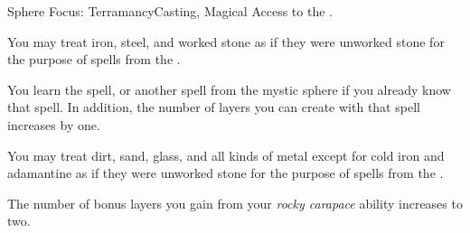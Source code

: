   \begin{magicalfeat}{Sphere Focus: Terramancy}{Casting, Magical}
    \featpre Access to the  .

     You may treat iron, steel, and worked stone as if they were unworked stone for the purpose of spells from the  .

     You learn the  spell, or another spell from the  mystic sphere if you already know that spell.
    In addition, the number of layers you can create with that spell increases by one.

     You may treat dirt, sand, glass, and all kinds of metal except for cold iron and adamantine as if they were unworked stone for the purpose of spells from the  .

     The number of bonus layers you gain from your \textit{rocky carapace} ability increases to two.
  \end{magicalfeat}

